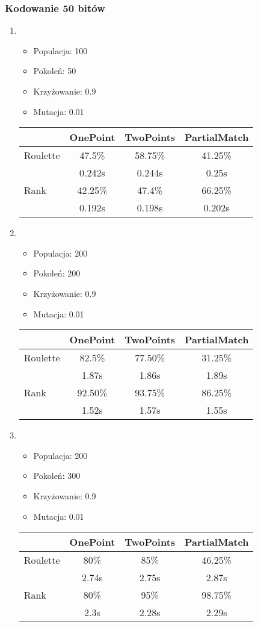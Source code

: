 \documentclass[a4paper,12pkt]{article}
\begin{document}
\subsubsection{Kodowanie 50 bitów}
\begin{enumerate}
\item
\begin{itemize}
\item Populacja: 100
\item Pokoleń: 50
\item Krzyżowanie: 0.9
\item Mutacja: 0.01
\end{itemize}
\begin{tabular}{l|c|c|c}
&OnePoint&TwoPoints&PartialMatch\\ \hline
Roulette&47.5\%&58.75\%&41.25\%\\
&0.242s&0.244s&0.25s\\ \hline
Rank&42.25\%&47.4\%&66.25\%\\
&0.192s&0.198s&0.202s\\ \hline
\end{tabular}
\item
\begin{itemize}
\item Populacja: 200
\item Pokoleń: 200
\item Krzyżowanie: 0.9
\item Mutacja: 0.01
\end{itemize}
\begin{tabular}{l|c|c|c}
&OnePoint&TwoPoints&PartialMatch\\ \hline
Roulette&82.5\%&77.50\%&31.25\%\\
&1.87s&1.86s&1.89s\\ \hline
Rank&92.50\%&93.75\%&86.25\%\\
&1.52s&1.57s&1.55s\\ \hline
\end{tabular}
\item
\begin{itemize}
\item Populacja: 200
\item Pokoleń: 300
\item Krzyżowanie: 0.9
\item Mutacja: 0.01
\end{itemize}
\begin{tabular}{l|c|c|c}
&OnePoint&TwoPoints&PartialMatch\\ \hline
Roulette&80\%&85\%&46.25\%\\
&2.74s&2.75s&2.87s\\ \hline
Rank&80\%&95\%&98.75\%\\
&2.3s&2.28s&2.29s\\ \hline
\end{tabular}
\end{enumerate}
\end{document}
